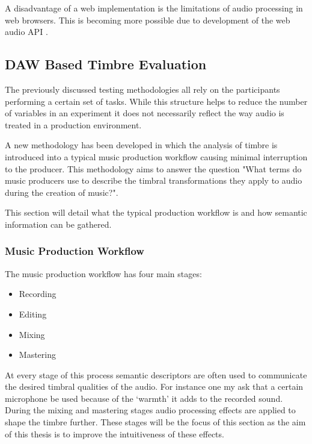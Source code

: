 		A disadvantage of a web implementation is the limitations of audio processing in web browsers. This is
		becoming more possible due to development of the web audio API \citep{adenot2015web}.

	\subsection{DAW Based Timbre Evaluation} %
	\label{sec:ListeningTests-DistributedListeningTests-DAWBasedTimbreEvaluation}
		The previously discussed testing methodologies all rely on the participants performing a certain set of
		tasks. While this structure helps to reduce the number of variables in an experiment it does not necessarily
		reflect the way audio is treated in a production environment.

		A new methodology has been developed in which the analysis of timbre is introduced into a typical music
		production workflow causing minimal interruption to the producer. This methodology aims to answer the
		question "What terms do music producers use to describe the timbral transformations they apply to audio
		during the creation of music?". 
		
		This section will detail what the typical production workflow is and how semantic information can be
		gathered.

		\subsubsection{Music Production Workflow}

			The music production workflow has four main stages:

			\begin{itemize}
				\item Recording
				\item Editing
				\item Mixing
				\item Mastering
			\end{itemize}

			At every stage of this process semantic descriptors are often used to communicate the desired
			timbral qualities of the audio. For instance one my ask that a certain microphone be used because of
			the `warmth' it adds to the recorded sound. During the mixing and mastering stages audio processing
			effects are applied to shape the timbre further.  These stages will be the focus of this section as
			the aim of this thesis is to improve the intuitiveness of these effects.

